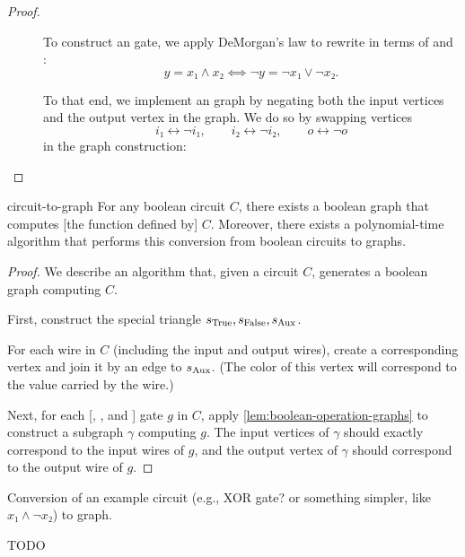\documentclass{report-snippet}
\begin{document}
\begin{proof}
\begin{description}
\item[\AND] To construct an \AND{} gate, we apply DeMorgan's law to rewrite
  \AND{} in terms of \NOT{} and \OR:
  \[
    y=x₁∧x₂ ⟺ ¬y=¬x₁∨¬x₂.
  \]

  To that end, we implement an \AND{} graph by negating both the input
  vertices and the output vertex in the \OR{} graph.  We do so by swapping
  vertices
  \[
    i₁↔¬i₁, \qquad i₂↔¬i₂, \qquad o↔¬o
  \]
  in the \OR{} graph construction:

  \begin{center}
  \end{center}


\end{description}

\end{proof}

\begin{theorem}{}{circuit-to-graph}%
  For any boolean circuit \(C\), there exists a boolean graph that computes
  [the function defined by] \(C\).  Moreover, there exists a polynomial-time
  algorithm that performs this conversion from boolean circuits to graphs.
\end{theorem}

\begin{proof}
  We describe an algorithm that, given a circuit \(C\), generates a boolean
  graph computing \(C\).

  First, construct the special triangle \(s_{\mathrm{True}},s_{\mathrm{False}},s_{\mathrm{Aux}}\).

  For each wire in \(C\) (including the input and output wires), create a
  corresponding vertex and join it by an edge to \(s_{\mathrm{Aux}}\). (The color of this
  vertex will correspond to the value carried by the wire.)

  Next, for each [\NOT, \OR, and \AND] gate \(g\) in \(C\), apply
  \cref{lem:boolean-operation-graphs} to construct a subgraph \(γ\) computing
  \(g\).  The input vertices of \(γ\) should exactly correspond to the input
  wires of \(g\), and the output vertex of \(γ\) should correspond to the
  output wire of \(g\).


\end{proof}

\begin{example}{}{}
  Conversion of an example circuit (e.g., XOR gate?  or something simpler, like
  \(x₁∧¬x₂\)) to graph.

  TODO
\end{example}
\end{document}
